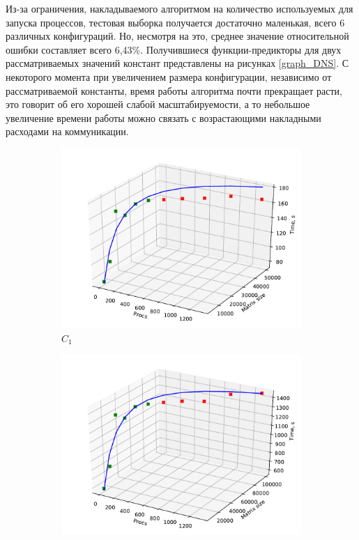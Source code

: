 			Из-за ограничения, накладываемого алгоритмом на количество используемых для запуска процессов, тестовая выборка получается достаточно маленькая, всего 6 различных конфигураций. Но, несмотря на это, среднее значение относительной ошибки составляет всего 6,43\%. Получившиеся функции-предикторы для двух рассматриваемых значений констант представлены на рисунках \eqref{graph_DNS}. С некоторого момента при увеличением размера конфигурации, независимо от рассматриваемой константы, время работы алгоритма почти прекращает расти, это говорит об его хорошей слабой масштабируемости, а то небольшое увеличение времени работы можно связать с возрастающими накладными расходами на коммуникации.

			\begin{figure}
			\begin{subfigure}{.5\textwidth}
				\includegraphics[width=\linewidth]{./images/graph_C_1_DNS}
				\caption{\(C_1\)}
				\label{graph_C_1_DNS}
			\end{subfigure}
			\begin{subfigure}{.5\textwidth}
				\includegraphics[width=\linewidth]{./images/graph_C_2_DNS}

\end{subfigure}
\end{figure}
